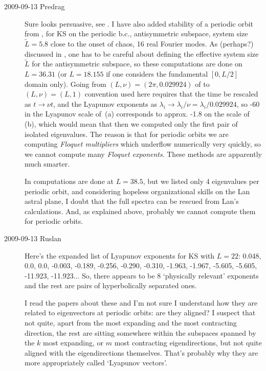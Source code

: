 \begin{description}
\item[2009-09-13 Predrag]
  Sure looks persuasive, see . I have also
  added stability of a periodic orbit from
  , for KS on the periodic b.c.,
  antisymmetric subspace, system size $\tilde{L} = 5.8$ close
  to the onset of chaos, 16 real Fourier modes. As (perhaps?)
  discussed in , one has to be careful about
  defining the effective system size $\tilde{L}$ for the
  antisymmetric subspace, so these computations are done on
  $L=36.31$ (or $L = 18.155$ if one considers the fundamental
  $[0,L/2]$ domain only). Going from $(L,\nu) =
  (2\pi,0.029924)$ of  to $(L,\nu) =
  (L,1)$ convention used here requires that the time be
  rescaled as $t \to \nu t$, and the Lyapunov exponents as
  $\lambda_i \to \lambda_i/ \nu = \lambda_i/ 0.029924 $, so -60
  in the Lyapunov scale of \,(a)
  corresponds to approx. -1.8 on the scale of
  \,(b), which would mean that then we
  computed only the first pair of isolated eigenvalues. The
  reason is that for periodic orbits we are computing {\em
    Floquet multipliers} which underflow numerically very
  quickly, so we cannot compute many {\em Floquet exponents}.
  These {\cLv} methods are apparently
  much smarter.

  In  computations are done at $L = 38.5$,
  but we listed only 4 eigenvalues per periodic orbit, and
  considering hopeless organizational skills on the Lan astral
  plane, I doubt that the full spectra can be rescued from
  Lan's calculations. And, as explained above, probably we cannot
  compute them for periodic orbits.

\item[2009-09-13 Ruslan]
  Here's the expanded list of Lyapunov exponents for KS with $L = 22$:
  0.048,    0.0,    0.0,   -0.003,   -0.189,   -0.256,   -0.290,   -0.310,
  -1.963,   -1.967,   -5.605,   -5.605,  -11.923,  -11.923...
  So, there appears to be 8 `physically relevant' exponents and
  the rest are pairs of hyperbolically separated ones.

  I read
  the papers about these {\cLvs} and I'm not
  sure I understand how they are related to eigenvectors at
  periodic orbits: are they aligned?  I suspect that not quite,
  apart from the most expanding and the most contracting
  direction, the rest are sitting somewhere within the
  subspaces spanned by the $k$ most expanding, or $m$ most
  contracting eigendirections, but not quite aligned with the
  eigendirections themselves.  That's probably why they are
  more appropriately called `Lyapunov vectors'.


\end{description}
